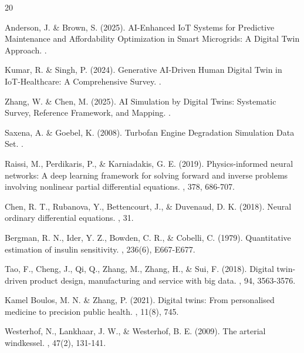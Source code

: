 \documentclass[12pt,a4paper]{article}
\begin{document}

\begin{thebibliography}{20}

Anderson, J. \& Brown, S. (2025).
\newblock AI-Enhanced IoT Systems for Predictive Maintenance and Affordability Optimization in Smart Microgrids: A Digital Twin Approach.
.

Kumar, R. \& Singh, P. (2024).
\newblock Generative AI-Driven Human Digital Twin in IoT-Healthcare: A Comprehensive Survey.
.

Zhang, W. \& Chen, M. (2025).
\newblock AI Simulation by Digital Twins: Systematic Survey, Reference Framework, and Mapping.
.

Saxena, A. \& Goebel, K. (2008).
\newblock Turbofan Engine Degradation Simulation Data Set.
.

Raissi, M., Perdikaris, P., \& Karniadakis, G. E. (2019).
\newblock Physics-informed neural networks: A deep learning framework for solving forward and inverse problems involving nonlinear partial differential equations.
, 378, 686-707.

Chen, R. T., Rubanova, Y., Bettencourt, J., \& Duvenaud, D. K. (2018).
\newblock Neural ordinary differential equations.
, 31.

Bergman, R. N., Ider, Y. Z., Bowden, C. R., \& Cobelli, C. (1979).
\newblock Quantitative estimation of insulin sensitivity.
, 236(6), E667-E677.

Tao, F., Cheng, J., Qi, Q., Zhang, M., Zhang, H., \& Sui, F. (2018).
\newblock Digital twin-driven product design, manufacturing and service with big data.
, 94, 3563-3576.

Kamel Boulos, M. N. \& Zhang, P. (2021).
\newblock Digital twins: From personalised medicine to precision public health.
, 11(8), 745.

Westerhof, N., Lankhaar, J. W., \& Westerhof, B. E. (2009).
\newblock The arterial windkessel.
, 47(2), 131-141.

\end{thebibliography}
\end{document}
